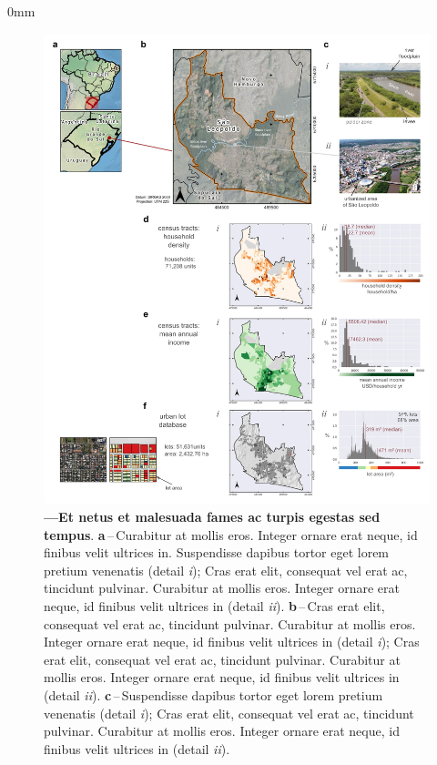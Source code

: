 \documentclass[./main.tex]{subfiles}
\begin{document}
\begin{adjustwidth}{\bodytab}{0mm}
\begin{figure}[t!] %
	\centering                                       
	\includegraphics[width=0.98\linewidth]{figs/fig_case.jpg}    
	\caption[Curabitur at mollis eros]
	{\textbf{---\;Et netus et malesuada fames ac turpis egestas sed tempus}.
		\textbf{a}\,--\,Curabitur at mollis eros. Integer ornare erat neque, id finibus velit ultrices in. Suspendisse dapibus tortor eget lorem pretium venenatis (detail \textrm{\textit{i}}); Cras erat elit, consequat vel erat ac, tincidunt pulvinar. Curabitur at mollis eros. Integer ornare erat neque, id finibus velit ultrices in (detail \textrm{\textit{ii}}).
		\textbf{b}\,--\,Cras erat elit, consequat vel erat ac, tincidunt pulvinar. Curabitur at mollis eros. Integer ornare erat neque, id finibus velit ultrices in (detail \textrm{\textit{i}}); Cras erat elit, consequat vel erat ac, tincidunt pulvinar. Curabitur at mollis eros. Integer ornare erat neque, id finibus velit ultrices in (detail \textrm{\textit{ii}}).
          \textbf{c}\,--\,Suspendisse dapibus tortor eget lorem pretium venenatis (detail \textrm{\textit{i}}); Cras erat elit, consequat vel erat ac, tincidunt pulvinar. Curabitur at mollis eros. Integer ornare erat neque, id finibus velit ultrices in (detail \textrm{\textit{ii}}).
	}
	\label{fig:fig_large}  %
\end{figure}


\end{adjustwidth}
\end{document}
